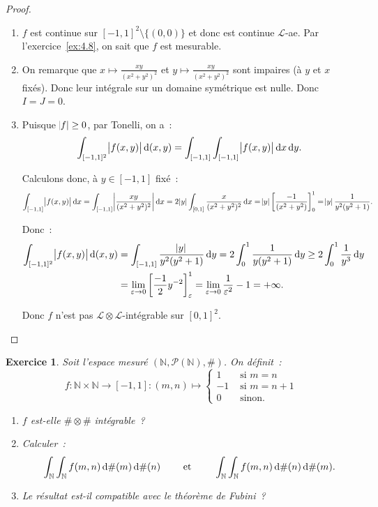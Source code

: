 \documentclass{article}
\newtheorem{ex}{Exercice}[section]
\newcommand{\pinfty}{{+\infty}}
\newcommand{\N}{{\mathbb N}}
\begin{document}
\begin{proof}~
\begin{enumerate}
	\item $f$ est continue sur $[-1, 1]^2 \setminus \{(0, 0)\}$ et donc est continue $\mathcal L$-ae. Par l'exercice~\ref{ex:4.8}, on sait que $f$ est mesurable.
	\item On remarque que $x \mapsto \frac {xy}{(x^2+y^2)^2}$ et $y \mapsto \frac {xy}{(x^2+y^2)^2}$ sont impaires (à $y$ et $x$ fixés). Donc leur intégrale sur un domaine
	symétrique est nulle. Donc $I = J = 0$.
	\item Puisque $\abs f \geq 0$, par Tonelli, on a~:
	\[\int_{[-1, 1]^2}\abs {f(x, y)}\dif\,(x,y) = \int_{[-1, 1]}\int_{[-1, 1]}\abs {f(x, y)}\dif x\dif y.\]

	Calculons donc, à $y \in [-1, 1]$ fixé~:
	\[\int_{[-1, 1]}\abs {f(x, y)}\dif x = \int_{[-1, 1]}\abs {\frac {xy}{(x^2+y^2)^2}}\dif x = 2\abs y\int_{[0, 1]}\frac x{(x^2+y^2)^2}\dif x
		= \abs y\left[\frac {-1}{(x^2+y^2)}\right]_0^1 = \abs y\frac 1{y^2(y^2+1)}.\]

	Donc~:
	\begin{align*}
		\int_{[-1, 1]^2}\abs {f(x, y)}\dif\,(x,y) &= \int_{[-1, 1]}\frac {\abs y}{y^2(y^2+1)}\dif y = 2\int_0^1\frac 1{y(y^2+1)}\dif y \geq 2\int_0^1\frac 1{y^3}\dif y \\
		&= \lim_{\varepsilon \to 0}\left[\frac {-1}2y^{-2}\right]_\varepsilon^1 = \lim_{\varepsilon \to 0}\frac 1{\varepsilon^2}-1 = \pinfty.
	\end{align*}

	Donc $f$ n'est pas $\mathcal L \otimes \mathcal L$-intégrable sur $[0, 1]^2$.
\end{enumerate}
\end{proof}

\begin{ex} Soit l'espace mesuré $(\N, \mathcal P(\N), \#)$. On définit~:
\[f : \N \times \N \to [-1, 1] : (m, n) \mapsto \begin{cases}1 &\text{ si } m = n\\-1 &\text{ si }m=n+1 \\0 &\text{ sinon.}\end{cases}\]
\begin{enumerate}
	\item $f$ est-elle $\# \otimes \#$ intégrable~?
	\item Calculer~:
	\[\int_\N\int_\N f(m, n)\dif\#(m)\dif\#(n) \qquad \text{ et } \qquad \int_\N\int_\N f(m, n)\dif\#(n)\dif\#(m).\]
	\item Le résultat est-il compatible avec le théorème de Fubini~?
\end{enumerate}
\end{ex}
\end{document}
